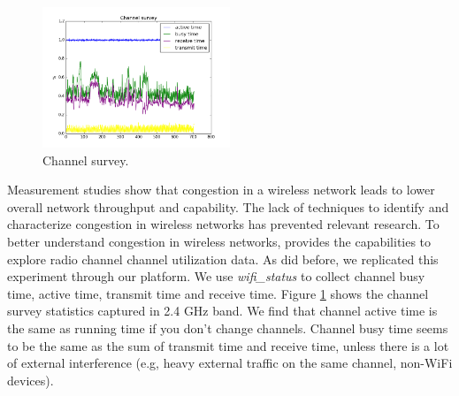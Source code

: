 \begin{figure}
\centering
\includegraphics[width=0.5\textwidth]{figure/channel.png}
\caption{Channel survey.} 
\label{fig:channelsurvey}
\end{figure}
Measurement studies show that congestion in a wireless network leads to lower overall network throughput and capability. The lack of techniques to identify and characterize congestion in wireless networks has prevented relevant research. To better understand congestion in wireless networks, \sysname provides the capabilities to explore radio channel channel utilization data. 
\newline
As \cite{channelsurvey} did before, we replicated this experiment through our \sysname platform. We use \textit{wifi\_status} to collect channel busy time, active time, transmit time and receive time. Figure \ref{fig:channelsurvey} shows the channel survey statistics captured in 2.4 GHz band. We find that channel active time is the same as running time if you don't change channels. Channel busy time seems to be the same as the sum of transmit time and receive time, unless there is a lot of external interference (e.g, heavy external traffic on the same channel, non-WiFi devices).
